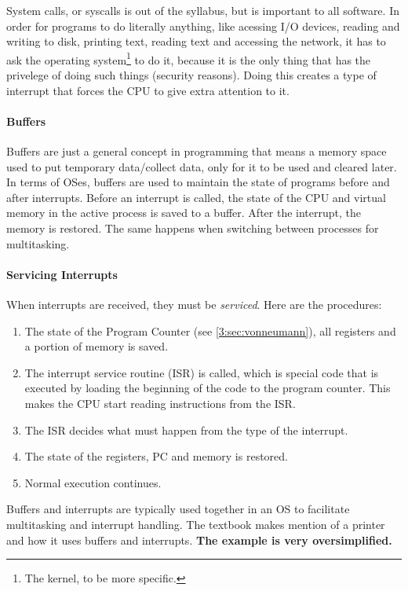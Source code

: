 \documentclass[../main.tex]{subfiles}
\begin{document}
System calls, or syscalls is out of the syllabus, but is important to all software. In order for programs to do literally anything, like acessing I/O devices, reading and writing to disk, printing text, reading text and accessing the network, it has to ask the operating system\footnote{The kernel, to be more specific.} to do it, because it is the only thing that has the privelege of doing such things (security reasons). Doing this creates a type of interrupt that forces the CPU to give extra attention to it.

\paragraph{Buffers}

Buffers are just a general concept in programming that means a memory space used to put temporary data/collect data, only for it to be used and cleared later. In terms of OSes, buffers are used to maintain the state of programs before and after interrupts. Before an interrupt is called, the state of the CPU and virtual memory in the active process is saved to a buffer. After the interrupt, the memory is restored. The same happens when switching between processes for multitasking.

\paragraph{Servicing Interrupts}

When interrupts are received, they must be \emph{serviced}. Here are the procedures:

\begin{enumerate}
    \item The state of the Program Counter (see \ref{3:sec:vonneumann}), all registers and a portion of memory is saved.
    \item The interrupt service routine (ISR) is called, which is special code that is executed by loading the beginning of the code to the program counter. This makes the CPU start reading instructions from the ISR.
    \item The ISR decides what must happen from the type of the interrupt.
    \item The state of the registers, PC and memory is restored.
    \item Normal execution continues.
\end{enumerate}

Buffers and interrupts are typically used together in an OS to facilitate multitasking and interrupt handling. The textbook makes mention of a printer and how it uses buffers and interrupts. \textbf{The example is very oversimplified.}
\end{document}
